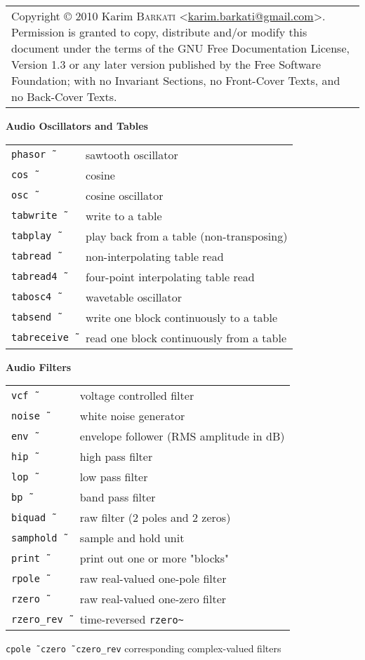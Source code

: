 \documentclass[a4paper, landscape, 10pt]{article}
\newcommand{\email}[1]{\href{mailto:#1}{\textsf{#1}}}
\newcommand{\refcardtitle}[1]{
  \begin{center}
    \textbf{\small{#1}}
  \end{center}
}
\begin{document}
\begin{multicols}{3}
  \medskip{} 
  \noindent{}
  \begin{tabularx}{9cm}{X}
    \tiny{Copyright \copyright{ 2010} Karim \textsc{Barkati} <\email{karim.barkati@gmail.com}>. Permission is granted to copy, distribute and/or modify this document under the terms of the GNU Free Documentation License, Version 1.3 or any later version published by the Free Software Foundation; with no Invariant Sections, no Front-Cover Texts, and no Back-Cover Texts.}
  \end{tabularx}

  \columnbreak
  \refcardtitle{Audio Oscillators and Tables}
  \begin{tabularx}{9cm}{>{\tt}l X}
    phasor\~\ & sawtooth oscillator \\
    cos\~\ & cosine \\
    osc\~\ & cosine oscillator \\
    tabwrite\~\ & write to a table \\
    tabplay\~\ & play back from a table (non-transposing) \\
    tabread\~\ & non-interpolating table read \\
    tabread4\~\ & four-point interpolating table read \\
    tabosc4\~\ & wavetable oscillator \\ 
    tabsend\~\ & write one block continuously to a table \\
    tabreceive\~\ & read one block continuously from a table \\
  \end{tabularx}

  \refcardtitle{Audio Filters}
  \begin{tabularx}{9cm}{>{\tt}l X}
    vcf\~\ & voltage controlled filter \\
    noise\~\ &  white noise generator \\
    env\~\ & envelope follower (RMS amplitude in dB) \\
    hip\~\ &  high pass filter \\
    lop\~\ &  low pass filter \\ 
    bp\~\ &  band pass filter \\
    biquad\~\ & raw filter (2 poles and 2 zeros)\\ 
    samphold\~\ & sample and hold unit \\
    print\~\ & print out one or more "blocks" \\
    rpole\~\ & raw real-valued one-pole filter \\
    rzero\~\ & raw real-valued one-zero filter \\
    rzero\_rev\~\ & time-reversed \texttt{rzero\~} \\
  \end{tabularx}
  \texttt{cpole\~\, czero\~\, czero\_rev} corresponding complex-valued filters


\end{multicols}
\end{document}
